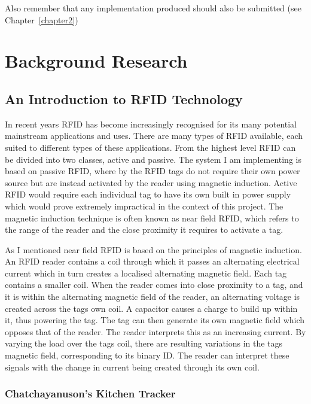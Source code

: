 \documentclass[]{final_report}
\begin{document}
Also remember that any implementation produced should also be submitted (see Chapter~\ref{chapter2})

\chapter{\label{chapter2} Background Research}

\section{An Introduction to RFID Technology}

In recent years RFID has become increasingly recognised for its many potential mainstream applications and uses. There are many types of RFID\cite{intel} available, each suited to different types of these applications. From the highest level RFID can be divided into two classes, active and passive\cite{intel}. The system I am implementing is based on passive RFID, where by the RFID tags do not require their own power source but are instead activated by the reader using magnetic induction. Active RFID would require each individual tag to have its own built in power supply which would prove extremely impractical in the context of this project.  The magnetic induction technique is often known as near field RFID, which refers to the range of the reader and the close proximity it requires to activate a tag.

As I mentioned near field RFID is based on the principles of magnetic induction. \cite{intel}An RFID reader contains a coil through which it passes an alternating electrical current which in turn creates a localised alternating magnetic field. Each tag contains a smaller coil. When the reader comes into close proximity to a tag, and it is within the alternating magnetic field of the reader, an alternating voltage is created across the tags own coil. A capacitor causes a charge to build up within it, thus powering the tag. The tag can then generate its own magnetic field which opposes that of the reader. The reader interprets this as an increasing current. By varying the load over the tags coil, there are resulting variations in the tags magnetic field, corresponding to its binary ID. The reader can interpret these signals with the change in current being created through its own coil.


\subsection{Chatchayanuson's Kitchen Tracker}
\end{document}
